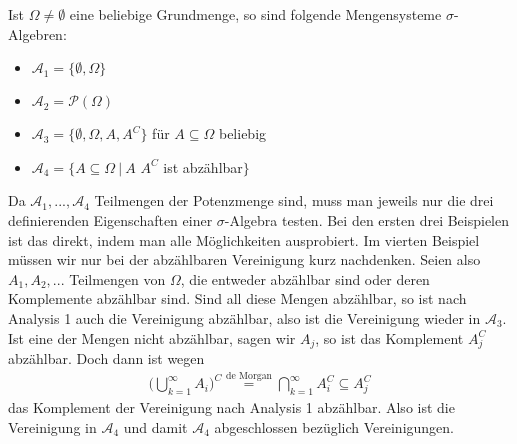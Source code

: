 \begin{example}
Ist $\Omega\neq \emptyset$ eine beliebige Grundmenge, so sind folgende Mengensysteme $\sigma$-Algebren:
\label{E1} \abs
\begin{itemize}
	\item $\mathcal{A}_1= \{ \emptyset, \Omega \}$
	\item $\mathcal A_2=\mathcal P(\Omega)$
	\item $\mathcal{A}_3 = \{ \emptyset, \Omega, A, A^C \}$ für $A \subseteq \Omega$ beliebig
	\item $\mathcal{A}_4 = \{ A \subseteq \Omega \: | \: A$  $A^C $ ist abzählbar$\}$
\end{itemize}
Da $\mathcal A_1,...,\mathcal A_4$ Teilmengen der Potenzmenge sind, muss man jeweils nur die drei definierenden Eigenschaften einer $\sigma$-Algebra testen. Bei den ersten drei Beispielen ist das direkt, indem man alle M\"oglichkeiten ausprobiert. Im vierten Beispiel m\"ussen wir nur bei der abz\"ahlbaren Vereinigung kurz nachdenken. Seien also $A_1, A_2, ...$ Teilmengen von $\Omega$, die entweder abz\"ahlbar sind oder deren Komplemente abz\"ahlbar sind. Sind all diese Mengen abz\"ahlbar, so ist nach Analysis 1 auch die Vereinigung abz\"ahlbar, also ist die Vereinigung wieder in $\mathcal A_3$. Ist eine der Mengen nicht abz\"ahlbar, sagen wir $A_j$, so ist das Komplement $A_j^C$ abz\"ahlbar. Doch dann ist wegen
\begin{align*}
	\Big(\bigcup_{k=1}^\infty A_i\Big)^C \overset{\text{de Morgan}}{=}  \bigcap_{k=1}^\infty A_i^C \subseteq A_j^C
\end{align*}
das Komplement der Vereinigung nach Analysis 1 abz\"ahlbar. Also ist die Vereinigung in $\mathcal A_4$ und damit $\mathcal A_4$ abgeschlossen bez\"uglich Vereinigungen.
\end{example}
